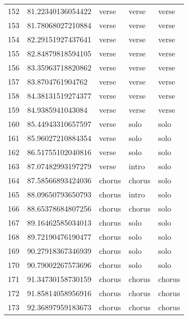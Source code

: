 \begin{table}[]
\begin{tabular}{lllll}
    152  & 81.22340136054422  & verse        & verse           & verse          \\
    153  & 81.78068027210884  & verse        & verse           & verse          \\
    154  & 82.29151927437641  & verse        & verse           & verse          \\
    155  & 82.84879818594105  & verse        & verse           & verse          \\
    156  & 83.35963718820862  & verse        & verse           & verse          \\
    157  & 83.8704761904762   & verse        & verse           & verse          \\
    158  & 84.38131519274377  & verse        & verse           & verse          \\
    159  & 84.9385941043084   & verse        & verse           & verse          \\
    160  & 85.44943310657597  & verse        & solo            & solo           \\
    161  & 85.96027210884354  & verse        & solo            & solo           \\
    162  & 86.51755102040816  & verse        & solo            & solo           \\
    163  & 87.07482993197279  & verse        & intro           & solo           \\
    164  & 87.58566893424036  & chorus       & chorus          & solo           \\
    165  & 88.09650793650793  & chorus       & intro           & solo           \\
    166  & 88.65378684807256  & chorus       & chorus          & solo           \\
    167  & 89.16462585034013  & chorus       & solo            & solo           \\
    168  & 89.72190476190477  & chorus       & solo            & solo           \\
    169  & 90.27918367346939  & chorus       & solo            & solo           \\
    170  & 90.79002267573696  & chorus       & solo            & solo           \\
    171  & 91.34730158730159  & chorus       & chorus          & chorus         \\
    172  & 91.85814058956916  & chorus       & chorus          & chorus         \\
    173  & 92.36897959183673  & chorus       & chorus          & chorus         \\

\end{tabular}
\end{table}
